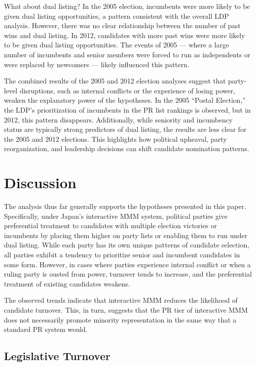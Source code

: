 \documentclass[a4paper, 11pt]{article}
\begin{document}
What about dual listing? In the 2005 election, incumbents were more likely to be given dual listing opportunities, a pattern consistent with the overall LDP analysis. However, there was no clear relationship between the number of past wins and dual listing. In 2012, candidates with more past wins were more likely to be given dual listing opportunities. The events of 2005 — where a large number of incumbents and senior members were forced to run as independents or were replaced by newcomers — likely influenced this pattern.

The combined results of the 2005 and 2012 election analyses suggest that party-level disruptions, such as internal conflicts or the experience of losing power, weaken the explanatory power of the hypotheses. In the 2005 “Postal Election,” the LDP’s prioritization of incumbents in the PR list rankings is observed, but in 2012, this pattern disappears. Additionally, while seniority and incumbency status are typically strong predictors of dual listing, the results are less clear for the 2005 and 2012 elections. This highlights how political upheaval, party reorganization, and leadership decisions can shift candidate nomination patterns.

\section{Discussion} \label{sec: dis}

The analysis thus far generally supports the hypotheses presented in this paper. Specifically, under Japan’s interactive MMM system, political parties give preferential treatment to candidates with multiple election victories or incumbents by placing them higher on party lists or enabling them to run under dual listing. While each party has its own unique patterns of candidate selection, all parties exhibit a tendency to prioritize senior and incumbent candidates in some form. However, in cases where parties experience internal conflict or when a ruling party is ousted from power, turnover tends to increase, and the preferential treatment of existing candidates weakens.

The observed trends indicate that interactive MMM reduces the likelihood of candidate turnover. This, in turn, suggests that the PR tier of interactive MMM does not necessarily promote minority representation in the same way that a standard PR system would.

\subsection{Legislative Turnover}
\end{document}
